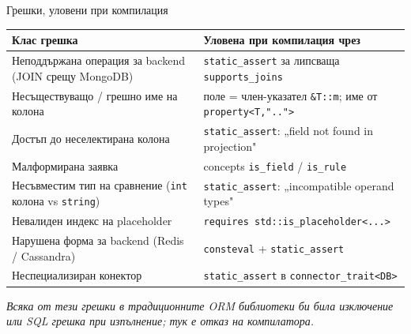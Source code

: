 \documentclass[aspectratio=169,12pt]{beamer}
\begin{document}
\begin{frame}{Грешки, уловени при компилация}
    \scriptsize
    \setlength{\tabcolsep}{4pt}
    \renewcommand{\arraystretch}{1.0}
    \begin{tabularx}{\linewidth}{@{}>{\raggedright\arraybackslash}p{6.9cm}>{\raggedright\arraybackslash}X@{}}
        \toprule
        \textbf{Клас грешка} & \textbf{Уловена при компилация чрез}\\
        \midrule
        Неподдържана операция за backend (JOIN срещу MongoDB)
            & \texttt{static\_assert} за липсваща \texttt{supports\_joins}\\
        Несъществуващо / грешно име на колона
            & поле = член-указател \texttt{\&T::m}; име от \texttt{property<T,"..">}\\
        Достъп до неселектирана колона
            & \texttt{static\_assert}: „field not found in projection"\\
        Малформирана заявка
            & concepts \texttt{is\_field} / \texttt{is\_rule}\\
        Несъвместим тип на сравнение (\texttt{int} колона vs \texttt{string})
            & \texttt{static\_assert}: „incompatible operand types"\\
        Невалиден индекс на placeholder
            & \texttt{requires std::is\_placeholder<...>}\\
        Нарушена форма за backend (Redis / Cassandra)
            & \texttt{consteval} + \texttt{static\_assert}\\
        Неспециализиран конектор
            & \texttt{static\_assert} в \texttt{connector\_trait<DB>}\\
        \bottomrule
    \end{tabularx}
    \vspace{0.15em}

    {\scriptsize\itshape Всяка от тези грешки в традиционните ORM библиотеки би била
    изключение или SQL грешка при изпълнение; тук е отказ на компилатора.}
\end{frame}
\end{document}
